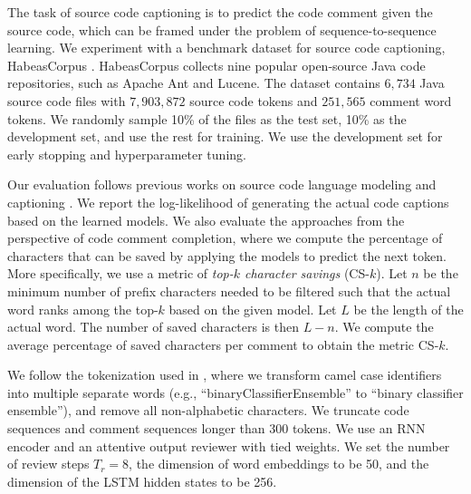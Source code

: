 \documentclass{article}
\begin{document}
The task of source code captioning is to predict the code comment given the source code, which can be framed under the problem of sequence-to-sequence learning. We experiment with a benchmark dataset for source code captioning, HabeasCorpus \cite{movshovitz2013natural}. HabeasCorpus collects nine popular open-source Java code repositories, such as Apache Ant and Lucene. The dataset contains $6,734$ Java source code files with $7,903,872$ source code tokens and $251,565$ comment word tokens. We randomly sample 10\% of the files as the test set, 10\% as the development set, and use the rest for training. We use the development set for early stopping and hyperparameter tuning.

Our evaluation follows previous works on source code language modeling \cite{maddison2014structured} and captioning \cite{movshovitz2013natural}. We report the log-likelihood of generating the actual code captions based on the learned models. We also evaluate the approaches from the perspective of code comment completion, where we compute the percentage of characters that can be saved by applying the models to predict the next token. More specifically, we use a metric of \textit{top-$k$ character savings}\cite{movshovitz2013natural} (CS-$k$). Let $n$ be the minimum number of prefix characters needed to be filtered such that the actual word ranks among the top-$k$ based on the given model. Let $L$ be the length of the actual word. The number of saved characters is then $L - n$. We compute the average percentage of saved characters per comment to obtain the metric CS-$k$.

We follow the tokenization used in \cite{movshovitz2013natural}, where we transform camel case identifiers into multiple separate words (e.g., ``binaryClassifierEnsemble'' to ``binary classifier ensemble''), and remove all non-alphabetic characters. We truncate code sequences and comment sequences longer than 300 tokens.
We use an RNN encoder and an attentive output reviewer with tied weights. We set the number of review steps $T_r = 8$, the dimension of word embeddings to be 50, and the dimension of the LSTM hidden states to be 256.
\end{document}
